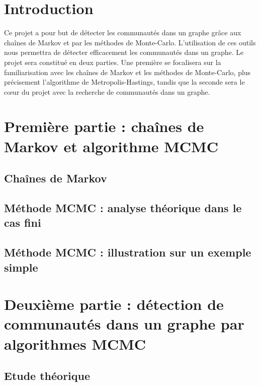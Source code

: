 \documentclass[11pt]{article}
\begin{document}
\thispagestyle{empty}
\tableofcontents
\listoffigures
\listoftables
\pagebreak
\setcounter{page}{1}

\section*{Introduction}
Ce projet a pour but de détecter les communautés dans un graphe grâce aux chaînes de Markov et par les méthodes de Monte-Carlo. L'utilisation de ces outils nous permettra de détecter efficacement les communautés dans un graphe.
Le projet sera constitué en deux parties. Une première se focalisera sur la familiarisation avec les chaînes de Markov et les méthodes de Monte-Carlo, plus précisement l'algorithme de Metropolis-Hastings, tandis que la seconde sera le cœur du projet 
avec la recherche de communautés dans un graphe.

\section{Première partie : chaînes de Markov et algorithme MCMC}

\subsection{Chaînes de Markov}


\subsection{Méthode MCMC : analyse théorique dans le cas fini}


\subsection{Méthode MCMC : illustration sur un exemple simple}


\section{Deuxième partie : détection de communautés dans un graphe par algorithmes MCMC}

\subsection{Etude théorique}

\end{document}
